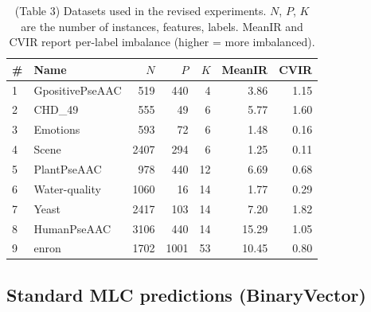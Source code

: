 \documentclass[11pt]{article}
\begin{document}
\begin{table}[!htbp]
\centering
\begin{tabular}{l|l|r|r|r|r|r}
\hline
\# & Name & $N$ & $P$ & $K$ & MeanIR & CVIR \\
\hline
1 & GpositivePseAAC & 519 & 440 & 4 & 3.86 & 1.15 \\
2 & CHD\_49 & 555 & 49 & 6 & 5.77 & 1.60 \\
3 & Emotions & 593 & 72 & 6 & 1.48 & 0.16 \\
4 & Scene & 2407 & 294 & 6 & 1.25 & 0.11 \\
5 & PlantPseAAC & 978 & 440 & 12 & 6.69 & 0.68 \\
6 & Water-quality & 1060 & 16 & 14 & 1.77 & 0.29 \\
7 & Yeast & 2417 & 103 & 14 & 7.20 & 1.82 \\
8 & HumanPseAAC & 3106 & 440 & 14 & 15.29 & 1.05 \\
9 & enron & 1702 & 1001 & 53 & 10.45 & 0.80 \\
\hline
\end{tabular}
\caption{(Table 3) Datasets used in the revised experiments. $N$, $P$, $K$ are the number of instances, features, labels. MeanIR and CVIR report per-label imbalance (higher = more imbalanced).}
\label{tab:datasets_revised}
\end{table}

\FloatBarrier

\subsection{Standard MLC predictions (BinaryVector)}
\end{document}
